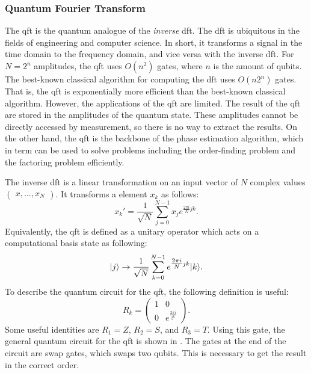 \subsubsection{Quantum Fourier Transform}
The \gls{qft} is the quantum analogue of the \emph{inverse} \gls{dft}.
The \gls{dft} is ubiquitous in the fields of engineering and computer science.
In short, it transforms a signal in the time domain to the frequency domain, and vice versa with the inverse \gls{dft}.
For $N = 2^n$ amplitudes, the \gls{qft} uses $O(n^2)$ gates, where $n$ is the amount of qubits.
The best-known classical algorithm for computing the \gls{dft} uses $O(n2^n)$ gates.
That is, the \gls{qft} is exponentially more efficient than the best-known classical algorithm.
However, the applications of the \gls{qft} are limited.
The result of the \gls{qft} are stored in the amplitudes of the quantum state.
These amplitudes cannot be directly accessed by measurement, so there is no way to extract the results.
On the other hand, the \gls{qft} is the backbone of the phase estimation algorithm, which in term can be used to solve problems including the order-finding problem and the factoring problem efficiently.

The inverse \gls{dft} is a linear transformation on an input vector of $N$ complex values $(\begin{matrix}x,\ldots,x_N\end{matrix})$.
It transforms a element $x_k$ as follows:
\begin{equation}
x_k' = \dfrac{1}{\sqrt{N}} \sum_{j=0}^{N-1} x_j e^{\tfrac{2\pi i}{N}jk}.
\end{equation}
Equivalently, the \gls{qft} is defined as a unitary operator which acts on a computational basis state  as following:
\begin{equation}
\vert{j}\rangle \rightarrow \dfrac{1}{\sqrt N}\sum_{k=0}^{N-1}e^{\tfrac{2\pi i}{N} jk}\vert{k}\rangle.
\end{equation}
To describe the quantum circuit for the \gls{qft}, the following definition is useful:
\begin{equation}
R_k = \begin{pmatrix}
1 & 0 \\
0 & e^{\tfrac{2\pi i}{2^k}}
\end{pmatrix}.
\end{equation}
Some useful identities are $R_1 = Z$, $R_2 = S$, and $R_3 = T$.
Using this gate, the general quantum circuit for the \gls{qft} is shown in .
The gates at the end of the circuit are swap gates, which swaps two qubits.
This is necessary to get the result in the correct order.

